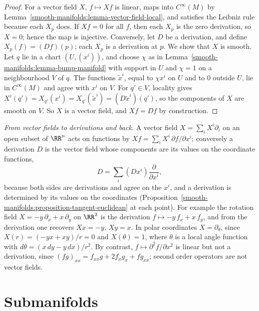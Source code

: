 \begin{proof}
For a vector field $X$, $f \mapsto Xf$ is linear, maps into $C^\infty(M)$ by Lemma~\ref{smooth-manifolds:lemma-vector-field-local}, and satisfies the Leibniz
rule because each $X_p$ does. If $Xf = 0$ for all $f$, then each $X_p$ is the zero derivation, so $X = 0$; hence the map is injective. Conversely, let $D$ be a
derivation, and define $X_p(f) = (Df)(p)$; each $X_p$ is a derivation at $p$. We show that $X$ is smooth. Let $q$ lie in a chart $(U, (x^i))$, and choose $\chi$
as in Lemma~\ref{smooth-manifolds:lemma-bump-manifold} with support in $U$ and $\chi = 1$ on a neighbourhood $V$ of $q$. The functions $\widetilde{x}^i$, equal to
$\chi x^i$ on $U$ and to $0$ outside $U$, lie in $C^\infty(M)$ and agree with $x^i$ on $V$. For $q' \in V$, locality gives
$X^i(q') = X_{q'}(x^i) = X_{q'}(\widetilde{x}^i) = (D\widetilde{x}^i)(q')$, so the components of $X$ are smooth on $V$. So $X$ is a vector field, and
$Xf = Df$ by construction.
\end{proof}

\begin{example}\label{smooth-manifolds:example-derivations-fields}
\emph{From vector fields to derivations and back.} A vector field $X = \sum_iX^i\partial_i$ on an open subset of $\RR^n$ acts on functions by $Xf = \sum_iX^i\,\partial f/\partial x^i$; conversely a
derivation $D$ is the vector field whose components are its values on the coordinate functions,
\[
D = \sum_i(Dx^i)\frac{\partial}{\partial x^i},
\]
because both sides are derivations and agree on the $x^i$, and a derivation is determined by its values on the coordinates (Proposition~\ref{smooth-manifolds:proposition-tangent-euclidean}
at each point). For example the rotation field $X = -y\,\partial_x + x\,\partial_y$ on $\RR^2$ is the derivation $f \mapsto -y\,f_x + x\,f_y$, and from the derivation one recovers
$Xx = -y$, $Xy = x$. In polar coordinates $X = \partial_\theta$, since $X(r) = (-y x + x y)/r = 0$ and $X(\theta) = 1$, where $\theta$ is a local angle function with
$d\theta = (x\,dy - y\,dx)/r^2$. By contrast, $f \mapsto \partial^2f/\partial x^2$ is linear but not a derivation, since $(fg)_{xx} = f_{xx}g + 2f_xg_x + fg_{xx}$; second order operators
are not vector fields.
\end{example}

\section{Submanifolds}\label{smooth-manifolds:section-submanifolds}

